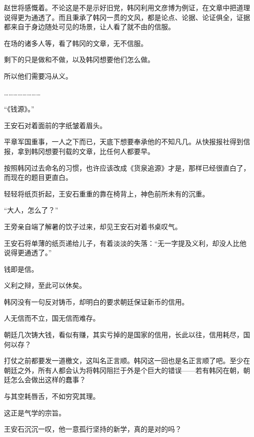 赵世将感慨着。不论这是不是示好旧党，韩冈利用文彦博为例证，在文章中把道理说得更为通透了。而且秉承了韩冈一贯的文风，都是论点、论据、论证俱全，证据都来自于身边随处可见的场景，让人看了就不由的信服。

在场的诸多人等，看了韩冈的文章，无不信服。

剩下的只是做和不做，以及韩冈想要他们怎么做。

所以他们需要冯从义。

……………………

“《钱源》。”

王安石对着面前的字纸皱着眉头。

平章军国重事，一人之下而已，天底下想要奉承他的不知凡几。从快报报社得到信报，拿到韩冈想要刊载的文章，比任何人都要早。

按照韩冈过去命名的习惯，也许应该改成《货泉追源》才是，那样已经很直白了，而现在的题目更直白。

轻轻将纸页折起，王安石重重的靠在椅背上，神色前所未有的沉重。

“大人，怎么了？”

王旁亲自端了解暑的饮子过来，却见王安石对着书桌叹气。

王安石将单薄的纸页递给儿子，有着淡淡的失落：“无一字提及义利，却没人比他说得更通透了。”

钱即是信。

义利之辩，至此可以休矣。

韩冈没有一句反对铸币，却明白的要求朝廷保证新币的信用。

人无信而不立，国无信而难存。

朝廷几次铸大钱，看似有赚，其实亏掉的是国家的信用，长此以往，信用耗尽，国何以存？

打仗之前都要发一道檄文，这叫名正言顺。韩冈这一回也是名正言顺了吧。至少在朝廷之外，所有人都会认为将韩冈阻拦于外是个巨大的错误——若有韩冈在朝，朝廷怎么会做出这样的蠢事？

与其空耗唇舌，不如穷究其理。

这正是气学的宗旨。

王安石沉沉一叹，他一意孤行坚持的新学，真的是对的吗？


